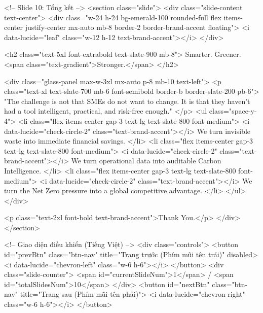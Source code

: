         <!-- Slide 10: Tổng kết -->
        <section class="slide">
            <div class="slide-content text-center">
                <div class="w-24 h-24 bg-emerald-100 rounded-full flex items-center justify-center mx-auto mb-8 border-2 border-brand-accent floating">
                    <i data-lucide="leaf" class="w-12 h-12 text-brand-accent"></i>
                </div>
                
                <h2 class="text-5xl font-extrabold text-slate-900 mb-8">
                    Smarter. Greener. <span class="text-gradient">Stronger.</span>
                </h2>
                
                <div class="glass-panel max-w-3xl mx-auto p-8 mb-10 text-left">
                    <p class="text-xl text-slate-700 mb-6 font-semibold border-b border-slate-200 pb-6">
                        "The challenge is not that SMEs do not want to change. It is that they haven't had a tool intelligent, practical, and risk-free enough."
                    </p>
                    <ul class="space-y-4">
                        <li class="flex items-center gap-3 text-lg text-slate-800 font-medium">
                            <i data-lucide="check-circle-2" class="text-brand-accent"></i> We turn invisible waste into immediate financial savings.
                        </li>
                        <li class="flex items-center gap-3 text-lg text-slate-800 font-medium">
                            <i data-lucide="check-circle-2" class="text-brand-accent"></i> We turn operational data into auditable Carbon Intelligence.
                        </li>
                        <li class="flex items-center gap-3 text-lg text-slate-800 font-medium">
                            <i data-lucide="check-circle-2" class="text-brand-accent"></i> We turn the Net Zero pressure into a global competitive advantage.
                        </li>
                    </ul>
                </div>
                
                <p class="text-2xl font-bold text-brand-accent">Thank You.</p>
            </div>
        </section>

        <!-- Giao diện điều khiển (Tiếng Việt) -->
        <div class="controls">
            <button id="prevBtn" class="btn-nav" title="Trang trước (Phím mũi tên trái)" disabled>
                <i data-lucide="chevron-left" class="w-6 h-6"></i>
            </button>
            <div class="slide-counter">
                <span id="currentSlideNum">1</span> / <span id="totalSlidesNum">10</span>
            </div>
            <button id="nextBtn" class="btn-nav" title="Trang sau (Phím mũi tên phải)">
                <i data-lucide="chevron-right" class="w-6 h-6"></i>
            </button>
            
